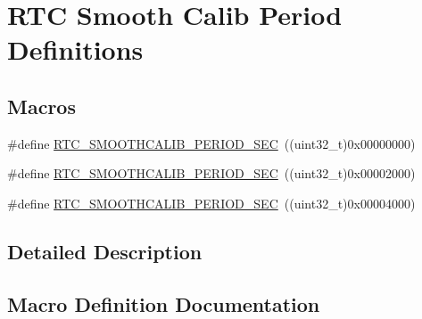 \hypertarget{group___r_t_c_ex___smooth__calib__period___definitions}{}\section{R\+TC Smooth Calib Period Definitions}
\label{group___r_t_c_ex___smooth__calib__period___definitions}
\subsection*{Macros}
\begin{DoxyCompactItemize}
\item 
\#define \hyperlink{group___r_t_c_ex___smooth__calib__period___definitions_gaab8a844313898595cd72f86570198e5a}{R\+T\+C\+\_\+\+S\+M\+O\+O\+T\+H\+C\+A\+L\+I\+B\+\_\+\+P\+E\+R\+I\+O\+D\+\_\+S\+EC}~((uint32\+\_\+t)0x00000000)
\item 
\#define \hyperlink{group___r_t_c_ex___smooth__calib__period___definitions_ga0c192bdebd2496f60b8a4aa7db499262}{R\+T\+C\+\_\+\+S\+M\+O\+O\+T\+H\+C\+A\+L\+I\+B\+\_\+\+P\+E\+R\+I\+O\+D\+\_\+S\+EC}~((uint32\+\_\+t)0x00002000)
\item 
\#define \hyperlink{group___r_t_c_ex___smooth__calib__period___definitions_ga0993db27ee5b25c8db41c8e58b478ffe}{R\+T\+C\+\_\+\+S\+M\+O\+O\+T\+H\+C\+A\+L\+I\+B\+\_\+\+P\+E\+R\+I\+O\+D\+\_\+S\+EC}~((uint32\+\_\+t)0x00004000)
\end{DoxyCompactItemize}


\subsection{Detailed Description}


\subsection{Macro Definition Documentation}
